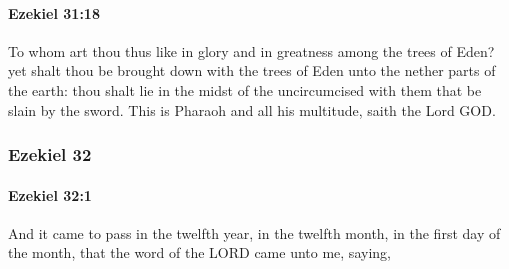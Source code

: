 		\paragraph{Ezekiel 31:18} %
			\label{EZEKIEL-31-18}

			To whom art thou thus like in glory and in greatness among the trees of Eden? yet shalt thou be brought down with the trees of Eden unto the nether parts of the earth: thou shalt lie in the midst of the uncircumcised with them that be slain by the sword. This is Pharaoh and all his multitude, saith the Lord GOD.

	\subsubsection{Ezekiel 32} %
		\label{EZEKIEL-32}

		\paragraph{Ezekiel 32:1} %
			\label{EZEKIEL-32-1}

			And it came to pass in the twelfth year, in the twelfth month, in the first day of the month, that the word of the LORD came unto me, saying,

